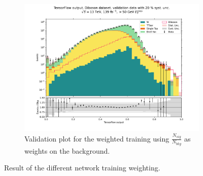\documentclass[14pt, a4paper]{book}
\begin{document}
\begin{figure}[!ht]
\begin{subfigure}[b]{0.49\textwidth}
        \centering
        \includegraphics[width=1\textwidth]{Balanced/VAL.pdf}
        \caption{Validation plot for the weighted training using $\frac{N_{sig}}{N_{bkg}}$ as weights on the background.}\label{fig:DibosonVALW}
     \end{subfigure}
	\caption{Result of the different network training weighting.}\label{fig:DibosonVAL}
\end{figure}
\end{document}
